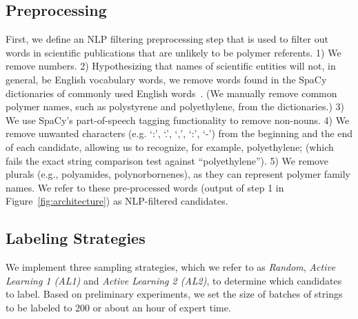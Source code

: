 \subsection{Preprocessing}
First, we define an
NLP filtering preprocessing step that is used to filter out
words in scientific publications that are unlikely to be polymer referents. 1) We remove numbers. 2)
Hypothesizing that names of scientific entities will not, in general, be English
vocabulary words, we remove words found in the SpaCy dictionaries
of commonly used English words~\cite{choi2015depends}. (We manually remove common polymer
names, such as polystyrene and polyethylene, from the dictionaries.) 3) We use
SpaCy's part-of-speech tagging functionality to remove non-nouns. 4) We remove
unwanted characters (e.g. `:', `.', `,', `:', `-') from the beginning and the end of each
candidate, allowing us to recognize, for example, polyethylene; (which fails the
exact string comparison test against ``polyethylene''). 5) We remove plurals (e.g.,
polyamides, polynorbornenes), as they can represent polymer family names.
We refer to these pre-processed words (output of step 1 in Figure~\ref{fig:architecture}) as NLP-filtered candidates.



\subsection{Labeling Strategies}



We implement three sampling strategies, which we refer to as \textit{Random}, \textit{Active Learning 1 (AL1)} and \textit{Active Learning 2 (AL2)}, 
to determine which candidates to label.
Based on preliminary experiments, we set the size of batches of strings to be labeled to 200 or about an hour of expert time.

